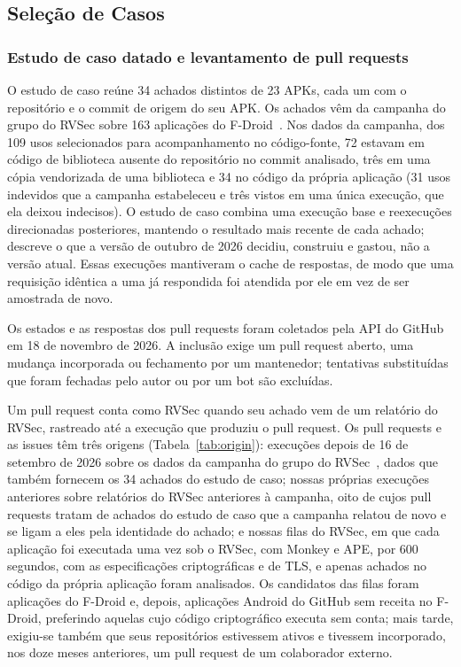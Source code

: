 \documentclass[conference]{IEEEtran}
\begin{document}
\subsection{Seleção de Casos}
\label{subsec:selection}

\subsubsection{Estudo de caso datado e levantamento de pull requests}

O estudo de caso reúne 34 achados distintos de 23 APKs, cada um com o
repositório e o commit de origem do seu APK. Os achados vêm da campanha do grupo do
RVSec sobre 163 aplicações do F-Droid~\cite{costa2026effectiveness}. Nos dados
da campanha, dos 109 usos selecionados para acompanhamento no código-fonte, 72
estavam em código de biblioteca ausente do repositório no commit analisado,
três em uma cópia vendorizada de uma biblioteca e 34 no código da própria
aplicação (31 usos indevidos que a campanha estabeleceu e três vistos em uma
única execução, que ela deixou indecisos). O estudo de caso combina uma
execução base e reexecuções direcionadas posteriores, mantendo o resultado mais
recente de cada achado; descreve o que a versão de outubro de 2026 decidiu,
construiu e gastou, não a versão atual. Essas execuções mantiveram o cache de
respostas, de modo que uma requisição idêntica a uma já respondida foi atendida
por ele em vez de ser amostrada de novo.

Os estados e as respostas dos pull requests foram coletados pela API do GitHub em
18 de novembro de 2026. A inclusão exige um pull request aberto, uma mudança incorporada ou fechamento
por um mantenedor; tentativas substituídas que foram fechadas pelo autor ou por um bot são
excluídas.

Um pull request conta como RVSec quando seu achado vem de um relatório do RVSec,
rastreado até a execução que produziu o pull request. Os pull requests e as
issues têm três origens (Tabela~\ref{tab:origin}): execuções depois de 16 de
setembro de 2026 sobre os dados da campanha do grupo do
RVSec~\cite{costa2026effectiveness}, dados que também fornecem os 34 achados do
estudo de caso; nossas próprias execuções anteriores sobre relatórios do RVSec
anteriores à campanha, oito de cujos pull requests tratam de achados do estudo
de caso que a campanha relatou de novo e se ligam a eles pela identidade do
achado; e nossas filas do RVSec, em que cada aplicação foi executada uma vez sob
o RVSec, com Monkey e APE, por 600 segundos, com as especificações
criptográficas e de TLS, e apenas achados no código da própria aplicação foram
analisados. Os candidatos das filas foram
aplicações do F-Droid e, depois, aplicações Android do GitHub sem receita no
F-Droid, preferindo aquelas cujo código criptográfico executa sem conta; mais
tarde, exigiu-se também que seus repositórios estivessem ativos e tivessem
incorporado, nos doze meses anteriores, um pull request de um colaborador
externo.
\end{document}
